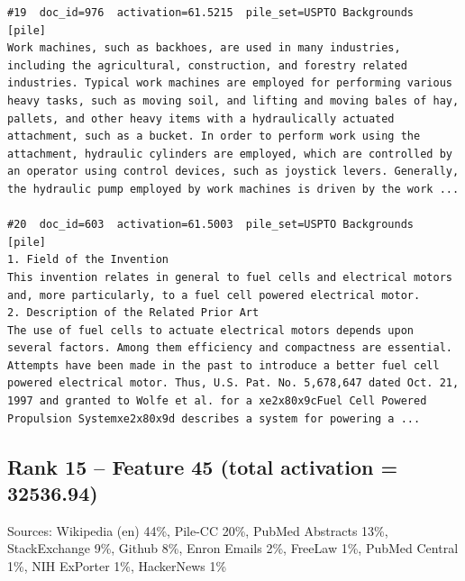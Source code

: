 \begin{verbatim}
#19  doc_id=976  activation=61.5215  pile_set=USPTO Backgrounds  [pile]
Work machines, such as backhoes, are used in many industries, including the agricultural, construction, and forestry related industries. Typical work machines are employed for performing various heavy tasks, such as moving soil, and lifting and moving bales of hay, pallets, and other heavy items with a hydraulically actuated attachment, such as a bucket. In order to perform work using the attachment, hydraulic cylinders are employed, which are controlled by an operator using control devices, such as joystick levers. Generally, the hydraulic pump employed by work machines is driven by the work ...

#20  doc_id=603  activation=61.5003  pile_set=USPTO Backgrounds  [pile]
1. Field of the Invention
This invention relates in general to fuel cells and electrical motors and, more particularly, to a fuel cell powered electrical motor.
2. Description of the Related Prior Art
The use of fuel cells to actuate electrical motors depends upon several factors. Among them efficiency and compactness are essential.
Attempts have been made in the past to introduce a better fuel cell powered electrical motor. Thus, U.S. Pat. No. 5,678,647 dated Oct. 21, 1997 and granted to Wolfe et al. for a xe2x80x9cFuel Cell Powered Propulsion Systemxe2x80x9d describes a system for powering a ...

\end{verbatim}

\subsection*{Rank 15 -- Feature 45 (total activation = 32536.94)}

Sources: Wikipedia (en) 44\%, Pile-CC 20\%, PubMed Abstracts 13\%, StackExchange 9\%, Github 8\%, Enron Emails 2\%, FreeLaw 1\%, PubMed Central 1\%, NIH ExPorter 1\%, HackerNews 1\%


